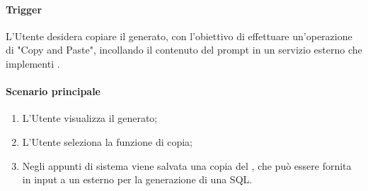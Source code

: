 \paragraph*{Trigger}
L'Utente desidera copiare il  generato, con l'obiettivo di effettuare un'operazione di "Copy and Paste", incollando il contenuto del prompt in un servizio esterno che implementi .

\paragraph*{Scenario principale}
\begin{enumerate}
  \item L'Utente visualizza il  generato;
  \item L'Utente seleziona la funzione di copia;
  \item Negli appunti di sistema viene salvata una copia del , che può essere fornita in input a un  esterno per la generazione di una  SQL.
\end{enumerate}
